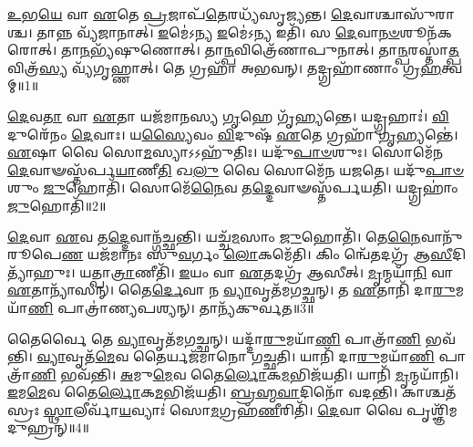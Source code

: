 \clearpage
{}
\setcounter{anuvakam}{0}

\-\ul{𑌉}\-𑌭\-\ul{𑌯𑍇} 𑌵𑌾 \ul{𑌏}\-𑌤𑍇 \ul{𑌪𑍍𑌰}\-𑌜𑌾𑌪᳴\-\ul{𑌤𑍇}\-𑌰𑌧𑍍𑌯᳴𑌸𑍃𑌜𑍍𑌯𑌨𑍍𑌤।
\-\ul{𑌦𑍇}\-𑌵𑌾𑌶𑍍𑌚𑌾𑌸𑍁᳴𑌰𑌾𑌶𑍍𑌚।
𑌤𑌾𑌨𑍍𑌨 𑌵𑍍𑌯᳴𑌜𑌾𑌨𑌾𑌤𑍍।
\-\ul{𑌇}\-𑌮𑍇॑𑌽𑌨𑍍𑌯 \ul{𑌇}\-𑌮𑍇॑𑌽𑌨𑍍𑌯 𑌇𑌤𑌿᳴।
𑌸 \ul{𑌦𑍇}\-𑌵𑌾\-\ul{𑌨}\-\-\ul{𑍞}\-𑌶𑍂𑌨᳴𑌕𑌰𑍋𑌤𑍍।
𑌤𑌾\-\ul{𑌨}\-𑌭𑍍𑌯᳴𑌷𑍁𑌣𑍋𑌤𑍍।
𑌤𑌾\-\ul{𑌨𑍍𑌪}\-𑌵𑌿𑌤𑍍𑌰𑍇᳴𑌣𑌾𑌪𑍁𑌨𑌾𑌤𑍍।
𑌤𑌾\-\ul{𑌨𑍍𑌪}\-𑌰𑌸𑍍𑌤𑌾॑\-\ul{𑌤𑍍𑌪}\-𑌵𑌿𑌤𑍍𑌰᳴\-\ul{𑌸𑍍𑌯} 𑌵𑍍𑌯᳴𑌗𑍃𑌹𑍍𑌣𑌾𑌤𑍍।
𑌤𑍇 𑌗𑍍𑌰𑌹𑌾᳴ 𑌅𑌭𑌵𑌨𑍍।
𑌤𑌦𑍍𑌗𑍍𑌰𑌹𑌾᳴𑌣𑌾𑌂 𑌗𑍍𑌰\-\ul{𑌹}\-𑌤𑍍𑌵𑌮𑍍॥1॥

\-\ul{𑌦𑍇}\-𑌵\-\ul{𑌤𑌾} 𑌵𑌾 \ul{𑌏}\-𑌤𑌾 𑌯𑌜᳴𑌮𑌾𑌨𑌸𑍍𑌯 \ul{𑌗𑍃}\-𑌹𑍇 𑌗𑍃᳴𑌹𑍍𑌯𑌨𑍍𑌤𑍇।
𑌯𑌦𑍍𑌗𑍍𑌰𑌹𑌾𑌃॑।
\-\ul{𑌵𑌿}\-𑌦𑍁𑌰𑍇᳴𑌨𑌂 \ul{𑌦𑍇}\-𑌵𑌾𑌃।
𑌯\-\ul{𑌸𑍍𑌯𑍈}\-𑌵𑌂 \ul{𑌵𑌿}\-𑌦𑍁𑌷᳴ \ul{𑌏}\-𑌤𑍇 𑌗𑍍𑌰𑌹𑌾᳴ \ul{𑌗𑍃}\-𑌹𑍍𑌯𑌨𑍍𑌤𑍇॑।
\-\ul{𑌏}\-𑌷𑌾 𑌵𑍈 𑌸𑍋\-\ul{𑌮}\-𑌸𑍍𑌯𑌾\-𑌽𑌽𑌹𑍁᳴𑌤𑌿𑌃।
𑌯𑌦𑍁᳴\-\ul{𑌪𑌾}\-\-\ul{𑍞}\-𑌶𑍁𑌃।
𑌸𑍋𑌮𑍇᳴𑌨 \ul{𑌦𑍇}\-𑌵𑌾𑍟𑌸𑍍𑌤᳴𑌰𑍍𑌪\-\ul{𑌯𑌾}\-𑌣𑍀\-\ul{𑌤𑌿} 𑌖\-\ul{𑌲𑍁} 𑌵𑍈 𑌸𑍋𑌮𑍇᳴𑌨 𑌯𑌜𑌤𑍇।
𑌯𑌦𑍁᳴\-\ul{𑌪𑌾}\-\-\ul{𑍞}\-𑌶𑍁𑌂 \ul{𑌜𑍁}\-𑌹𑍋𑌤𑌿᳴।
𑌸𑍋𑌮𑍇᳴\-\ul{𑌨𑍈}\-𑌵 𑌤\-\ul{𑌦𑍍𑌦𑍇}\-𑌵𑌾𑍟𑌸𑍍𑌤᳴𑌰𑍍𑌪𑌯𑌤𑌿।
𑌯𑌦𑍍𑌗𑍍𑌰𑌹𑌾𑌂॑ \ul{𑌜𑍁}\-𑌹𑍋𑌤𑌿᳴॥2॥

\-\ul{𑌦𑍇}\-𑌵𑌾 \ul{𑌏}\-𑌵 𑌤\-\ul{𑌦𑍍𑌦𑍇}\-𑌵𑌾𑌨𑍍𑌗᳴𑌚𑍍𑌛𑌨𑍍𑌤𑌿।
𑌯𑌚𑍍𑌚᳴\-\ul{𑌮}\-𑌸𑌾𑌂 \ul{𑌜𑍁}\-𑌹𑍋𑌤𑌿᳴।
𑌤𑍇\-\ul{𑌨𑍈}\-𑌵𑌾𑌨𑍁᳴𑌰𑍂𑌪𑍇\-\ul{𑌣} 𑌯𑌜᳴𑌮𑌾𑌨𑌃 𑌸𑍁\-\ul{𑌵}\-𑌰𑍍𑌗𑌂 \ul{𑌲𑍋}\-𑌕𑌮𑍇᳴𑌤𑌿।
𑌕𑌿𑌂 𑌨𑍍𑌵𑍇᳴𑌤𑌦𑌗𑍍𑌰᳴ 𑌆\-\ul{𑌸𑍀}\-𑌦𑌿𑌤𑍍𑌯𑌾᳴𑌹𑍁𑌃।
𑌯𑌤𑍍𑌪𑌾\-\ul{𑌤𑍍𑌰𑌾}\-𑌣𑍀𑌤𑌿᳴।
\-\ul{𑌇}\-𑌯𑌂 𑌵𑌾 \ul{𑌏}\-𑌤𑌦𑌗𑍍𑌰᳴ 𑌆𑌸𑍀𑌤𑍍।
\-\ul{𑌮𑍃}\-𑌨𑍍𑌮𑌯𑌾᳴\-\ul{𑌨𑌿} 𑌵𑌾 \ul{𑌏}\-𑌤𑌾𑌨𑍍𑌯𑌾᳴𑌸𑌨𑍍।
𑌤𑍈\-\ul{𑌰𑍍𑌦𑍇}\-𑌵𑌾 𑌨 \ul{𑌵𑍍𑌯𑌾}\-𑌵𑍃𑌤᳴𑌮𑌗𑌚𑍍𑌛𑌨𑍍।
𑌤 \ul{𑌏}\-𑌤𑌾𑌨𑌿᳴ 𑌦𑌾\-\ul{𑌰𑍁}\-𑌮𑌯𑌾᳴\-\ul{𑌣𑌿} 𑌪𑌾𑌤𑍍𑌰𑌾॑𑌣𑍍𑌯𑌪𑌶𑍍𑌯𑌨𑍍।
𑌤𑌾𑌨𑍍𑌯᳴𑌕𑍁𑌰𑍍𑌵𑌤॥3॥

𑌤𑍈𑌰𑍍𑌵𑍈 𑌤𑍇 \ul{𑌵𑍍𑌯𑌾}\-𑌵𑍃𑌤᳴𑌮𑌗𑌚𑍍𑌛𑌨𑍍।
𑌯𑌦𑍍𑌦𑌾᳴\-\ul{𑌰𑍁}\-𑌮𑌯𑌾᳴\-\ul{𑌣𑌿} 𑌪𑌾𑌤𑍍𑌰𑌾᳴\-\ul{𑌣𑌿} 𑌭𑌵᳴𑌨𑍍𑌤𑌿।
\-\ul{𑌵𑍍𑌯𑌾}\-𑌵𑍃𑌤᳴\-\ul{𑌮𑍇}\-𑌵 𑌤𑍈𑌰𑍍𑌯𑌜᳴𑌮𑌾𑌨𑍋 𑌗𑌚𑍍𑌛𑌤𑌿।
𑌯𑌾𑌨𑌿᳴ 𑌦𑌾\-\ul{𑌰𑍁}\-𑌮𑌯𑌾᳴\-\ul{𑌣𑌿} 𑌪𑌾𑌤𑍍𑌰𑌾᳴\-\ul{𑌣𑌿} 𑌭𑌵᳴𑌨𑍍𑌤𑌿।
\-\ul{𑌅}\-𑌮𑍁\-\ul{𑌮𑍇}\-𑌵 𑌤𑍈\-\ul{𑌰𑍍𑌲𑍋}\-𑌕\-\ul{𑌮}\-𑌭𑌿𑌜᳴𑌯𑌤𑌿।
𑌯𑌾𑌨𑌿᳴ \ul{𑌮𑍃}\-𑌨𑍍𑌮𑌯𑌾᳴𑌨𑌿।
\-\ul{𑌇}\-𑌮\-\ul{𑌮𑍇}\-𑌵 𑌤𑍈\-\ul{𑌰𑍍𑌲𑍋}\-𑌕\-\ul{𑌮}\-𑌭𑌿𑌜᳴𑌯𑌤𑌿।
\-\ul{𑌬𑍍𑌰}\-\-\ul{𑌹𑍍𑌮}\-\-\ul{𑌵𑌾}\-𑌦𑌿𑌨𑍋᳴ 𑌵𑌦𑌨𑍍𑌤𑌿।
𑌕𑌾𑌶𑍍𑌚𑌤᳴𑌸𑍍𑌰𑌃 \ul{𑌸𑍍𑌥𑌾}\-𑌲𑍀𑌰𑍍𑌵𑌾᳴\-\ul{𑌯}\-𑌵𑍍𑌯𑌾𑌃॑ 𑌸𑍋\-\ul{𑌮}\-𑌗𑍍𑌰𑌹᳴\-\ul{𑌣𑍀}\-𑌰𑌿𑌤𑌿᳴।
\-\ul{𑌦𑍇}\-𑌵𑌾 𑌵𑍈 𑌪𑍃𑌶𑍍𑌞𑌿᳴𑌮𑌦𑍁𑌹𑍍𑌰𑌨𑍍॥4॥


